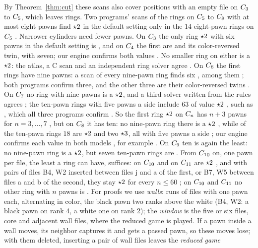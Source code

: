 By Theorem~\ref{thm:cut} these scans also cover positions with an empty file on $C_{3}$ to $C_{5}$, which
leaves rings. Two programs' scans of the rings on
$C_{5}$ to $C_{8}$ with at most eight pawns find $\mathord{\star2}$ in the default setting only in the $14$
eight-pawn rings on $C_{5}$ . Narrower cylinders need fewer pawns. On $C_{3}$ the only ring
$\mathord{\star2}$ with six pawns in the default setting is , and on $C_{4}$ the first
are  and its color-reversed twin, with seven; our engine confirms both values
. No smaller ring on either is a $\mathord{\star2}$: the atlas, a C scan and an independent ring solver agree
. On $C_{6}$ the first rings have nine pawns: a scan of every
nine-pawn ring finds six , among them ; both programs confirm
three, and the other three are their color-reversed twins . On $C_{7}$ no ring with nine pawns is a
$\mathord{\star2}$, and a third solver written from the rules agrees ; the ten-pawn rings with five pawns a side
include $63$ of value $\mathord{\star2}$ , such as , which all three
programs confirm . So the first ring $\mathord{\star2}$ on $C_{n}$ has $n+3$ pawns for $n=3,\dots,7$
, but on $C_{8}$ it has ten: no nine-pawn ring there is a $\mathord{\star2}$ , while of the ten-pawn
rings $18$ are $\mathord{\star2}$ and two $\mathord{\star3}$, all with five pawns a side ; our engine
confirms each value in both models , for example . On $C_{9}$
ten is again the least: no nine-pawn ring is a $\mathord{\star2}$, but seven ten-pawn rings are . From $C_{10}$ on, one pawn per file, the least a
ring can have, suffices:  on $C_{10}$ and  on $C_{11}$ are $\mathord{\star2}$ , and with pairs of files B4, W2 inserted between files j and a
of the first, or B7, W5 between files a and b of the second, they stay $\mathord{\star2}$ for every $n\le60$ ; on $C_{10}$ and $C_{11}$ no other ring with $n$ pawns is .
For proofs we use \emph{walls}: runs of files with one pawn each, alternating in color, the black pawn two
ranks above the white (B4, W2: a black pawn on rank 4, a white one on rank 2); the \emph{window} is the
five or six files, core and adjacent wall files, where the reduced game is played. If a pawn inside a wall moves, its neighbor captures it and gets a passed
pawn, so these moves lose; with them deleted, inserting a pair of wall files leaves the \emph{reduced game}

